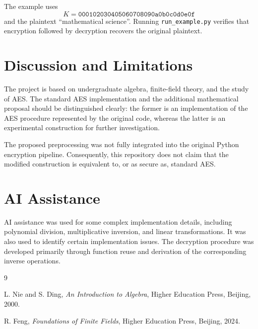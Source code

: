 \documentclass[11pt,a4paper]{article}
\begin{document}
The example uses
\[
K=\texttt{000102030405060708090a0b0c0d0e0f}
\]
and the plaintext ``mathematical science''. Running
\texttt{run\_example.py} verifies that encryption followed by decryption
recovers the original plaintext.

\section{Discussion and Limitations}

The project is based on undergraduate algebra, finite-field theory, and the
study of AES. The standard AES implementation and the additional mathematical
proposal should be distinguished clearly: the former is an implementation of
the AES procedure represented by the original code, whereas the latter is an
experimental construction for further investigation.

The proposed preprocessing was not fully integrated into the original Python
encryption pipeline. Consequently, this repository does not claim that the
modified construction is equivalent to, or as secure as, standard AES.

\section{AI Assistance}

AI assistance was used for some complex implementation details, including
polynomial division, multiplicative inversion, and linear transformations.
It was also used to identify certain implementation issues. The decryption
procedure was developed primarily through function reuse and derivation of
the corresponding inverse operations.

\begin{thebibliography}{9}

L. Nie and S. Ding,
\emph{An Introduction to Algebra},
Higher Education Press, Beijing, 2000.

R. Feng,
\emph{Foundations of Finite Fields},
Higher Education Press, Beijing, 2024.

\end{thebibliography}
\end{document}
